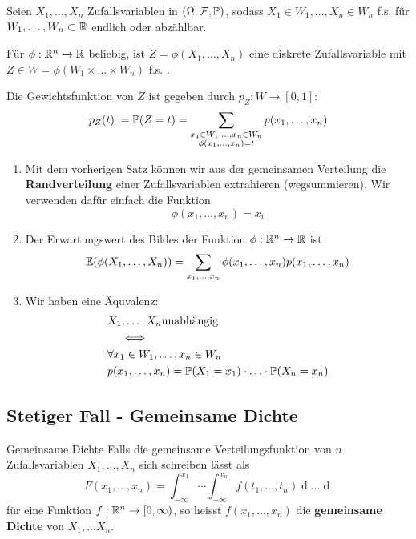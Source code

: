 \begin{subbox}{}
    Seien $X_1, \ldots, X_n$  Zufallsvariablen in $(\Omega, \F, \P)$, sodass $X_1 \in W_1, \ldots, X_n \in W_n$ f.s. für $W_1, \ldots, W_n \subset \R$ endlich oder abzählbar.

    Für $\phi: \R^n \to \R$ beliebig, ist $Z = \phi(X_1, \ldots, X_n)$ eine diskrete Zufallsvariable mit $Z \in W = \phi(W_1 \times \ldots \times W_n)$ f.s. . 

    Die Gewichtsfunktion von $Z$ ist gegeben durch $p_Z: W \to [0,1]$:
    $$p_Z(t) := \P(Z = t) = \sum_{\substack{x_1 \in W_1, \ldots, x_n \in W_n\\ \phi(x_1, \ldots, x_n) = t}} p(x_1, \ldots, x_n)$$
\end{subbox}
\begin{enumerate}
    \item Mit dem vorherigen Satz können wir aus der gemeinsamen Verteilung die \textbf{Randverteilung} einer Zufallsvariablen extrahieren (wegsummieren). Wir verwenden dafür einfach die Funktion 
    $$\phi(x_1, \ldots, x_n) = x_i$$
    \item Der Erwartungswert des Bildes der Funktion $\phi: \R^n \to \R$ ist
    $$\E(\phi(X_1, \ldots, X_n)) = \sum_{x_1, \ldots, x_n}\phi(x_1, \ldots, x_n)p(x_1, \ldots, x_n)$$
    \item Wir haben eine Äquvalenz: 
    \begin{align*}
        &X_1, \ldots, X_n \text{unabhängig}\\
        &\quad \iff \\
        &\forall x_1 \in W_1, \ldots, x_n \in W_n\\
        &p(x_1, \ldots, x_n) = \P(X_1 = x_1) \cdot \ldots \cdot \P(X_n = x_n)
    \end{align*}
\end{enumerate}

\subsection{Stetiger Fall - Gemeinsame Dichte}
\begin{mainbox}{Gemeinsame Dichte}
    Falls die gemeinsame Verteilungsfunktion von $n$ Zufallsvariablen $X_1, \ldots, X_n$ sich schreiben lässt als
    $$F(x_1, \ldots, x_n) = \int_{-\infty}^{x_1} \cdots \int_{-\infty}^{x_n}f(t_1, \ldots, t_n) \mathop{dt_n}\ldots\mathop{dt_1}$$
    für eine Funktion $f: \R^n \to [0, \infty)$, so heisst $f(x_1, \ldots, x_n)$ die \textbf{gemeinsame Dichte} von $X_1, \ldots X_n$.
\end{mainbox}
   
